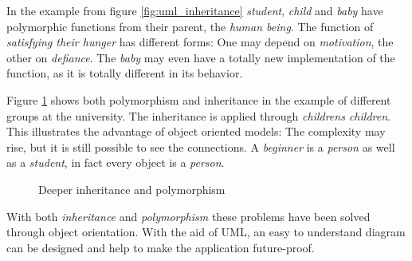 In the example from figure \ref{fig:uml_inheritance} \emph{student}, \emph{child} and \emph{baby} have polymorphic functions from their parent, the \emph{human being}. The function of \emph{satisfying their hunger} has different forms: One may depend on \emph{motivation}, the other on \emph{defiance}. The \emph{baby} may even have a totally new implementation of the function, as it is totally different in its behavior.

Figure \ref{fig:uml_inheritance_polymorphism} shows both polymorphism and inheritance in the example of different groups at the university. 
The inheritance is applied through \emph{childrens children}. This illustrates the advantage of object oriented models: The complexity may rise, but it is still possible to see the connections. A \emph{beginner} is a \emph{person} as well as a \emph{student}, in fact every object is a \emph{person}.

\begin{figure}[!h]
\begin{center}
\resizebox{.9\textwidth}{!}{
\begin{tikzpicture}
\tikzumlset{fill class=white!0}%
\umlclass{Person}{name\textcolor{white}{MMMM}\\}{eat()\\ work() \\ sleep()}
\umlclass[x=-3, y=-4, anchor=north]{Alumnus}{\strut}{visitUniversity()\\ drinkBeer()}
\umlclass[x=3, y=-4, anchor=north]{Student}{\strut}{visitLecture()\\ drinkBeer()}
\umlclass[x=9, y=-4, anchor=north]{Employee}{salary}{\strut\\\strut}
\umlclass[x=9, y=-9, anchor=north]{Professor}{\strut}{giveLecture()}
\umlclass[x=0, y=-9, anchor=north]{Beginner}{\strut}{visitEverything()}
\umlclass[x=5, y=-9, anchor=north]{Long-term student}{salary}{ignoreLecture()}
\umlVHVinherit{Alumnus}{Person} 
\umlVHVinherit{Student}{Person} 
\umlVHVinherit{Employee}{Person} 
\umlVHVinherit{Beginner}{Student} 
\umlVHVinherit{Long-term student}{Student} 
\umlVHVinherit{Professor}{Employee} 
\end{tikzpicture}
}
\end{center}
\caption{Deeper inheritance and polymorphism}
\label{fig:uml_inheritance_polymorphism}
\end{figure}

With both \emph{inheritance} and \emph{polymorphism} these problems have been solved through object orientation. With the aid of UML, an easy to understand diagram can be designed and help to make the application future-proof.

